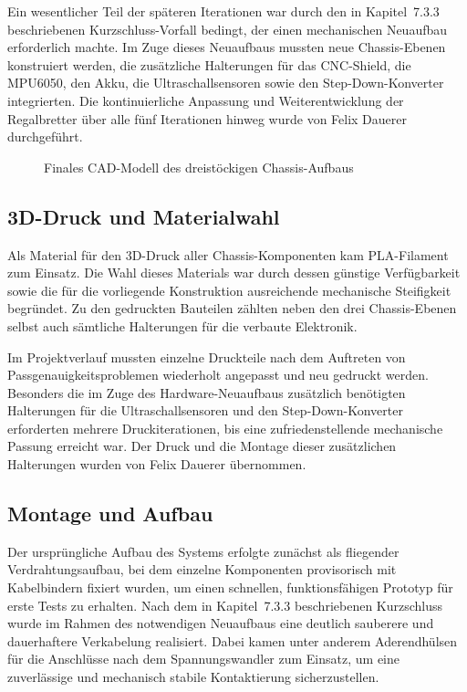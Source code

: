 \documentclass[12pt,ngerman,numbers=noenddot,abstracton,headsepline]{scrreprt}
\begin{document}
Ein wesentlicher Teil der späteren Iterationen war durch den in Kapitel~7.3.3 beschriebenen Kurzschluss-Vorfall bedingt, der einen mechanischen Neuaufbau erforderlich machte. Im Zuge dieses Neuaufbaus mussten neue Chassis-Ebenen konstruiert werden, die zusätzliche Halterungen für das CNC-Shield, die MPU6050, den Akku, die Ultraschallsensoren sowie den Step-Down-Konverter integrierten. Die kontinuierliche Anpassung und Weiterentwicklung der Regalbretter über alle fünf Iterationen hinweg wurde von Felix Dauerer durchgeführt.

\begin{figure}[h]
    \centering
    \caption{Finales CAD-Modell des dreistöckigen Chassis-Aufbaus}
    \label{fig:cad_chassis}
\end{figure}

\subsection{3D-Druck und Materialwahl}
\label{subsec:3ddruck}

Als Material für den 3D-Druck aller Chassis-Komponenten kam PLA-Filament zum Einsatz. Die Wahl dieses Materials war durch dessen günstige Verfügbarkeit sowie die für die vorliegende Konstruktion ausreichende mechanische Steifigkeit begründet. Zu den gedruckten Bauteilen zählten neben den drei Chassis-Ebenen selbst auch sämtliche Halterungen für die verbaute Elektronik.

Im Projektverlauf mussten einzelne Druckteile nach dem Auftreten von Passgenauigkeitsproblemen wiederholt angepasst und neu gedruckt werden. Besonders die im Zuge des Hardware-Neuaufbaus zusätzlich benötigten Halterungen für die Ultraschallsensoren und den Step-Down-Konverter erforderten mehrere Druckiterationen, bis eine zufriedenstellende mechanische Passung erreicht war. Der Druck und die Montage dieser zusätzlichen Halterungen wurden von Felix Dauerer übernommen.

\subsection{Montage und Aufbau}
\label{subsec:montage_aufbau}

Der ursprüngliche Aufbau des Systems erfolgte zunächst als fliegender Verdrahtungsaufbau, bei dem einzelne Komponenten provisorisch mit Kabelbindern fixiert wurden, um einen schnellen, funktionsfähigen Prototyp für erste Tests zu erhalten. Nach dem in Kapitel~7.3.3 beschriebenen Kurzschluss wurde im Rahmen des notwendigen Neuaufbaus eine deutlich sauberere und dauerhaftere Verkabelung realisiert. Dabei kamen unter anderem Aderendhülsen für die Anschlüsse nach dem Spannungswandler zum Einsatz, um eine zuverlässige und mechanisch stabile Kontaktierung sicherzustellen.
\end{document}
